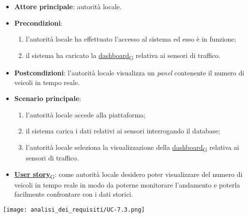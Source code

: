 \begin{itemize}
	\item \textbf{Attore principale}: autorità locale.
	\item \textbf{Precondizioni}:
	      \begin{enumerate}
		      \item l'autorità locale ha effettuato l'accesso al sistema ed esso è in funzione;
		      \item il sistema ha caricato la \href{https://7last.github.io/docs/rtb/documentazione-interna/glossario\#dashboard}{dashboard\textsubscript{G}} relativa ai sensori di traffico.
	      \end{enumerate}
	\item \textbf{Postcondizioni}: l'autorità locale visualizza un \textit{panel} contenente il numero di veicoli in tempo reale.
	\item \textbf{Scenario principale}:
	      \begin{enumerate}
		      \item l'autorità locale accede alla piattaforma;
		      \item il sistema carica i dati relativi ai sensori interrogando il database;
		      \item l'autorità locale seleziona la visualizzazione della \href{https://7last.github.io/docs/rtb/documentazione-interna/glossario\#dashboard}{dashboard\textsubscript{G}} relativa ai sensori di traffico.
	      \end{enumerate}
	\item \href{https://7last.github.io/docs/rtb/documentazione-interna/glossario\#user-story}{\textbf{User story}\textsubscript{G}}:
	      come autorità locale desidero poter visualizzare del numero di veicoli in tempo reale in modo da poterne monitorare l'andamento
	      e poterla facilmente confrontare con i dati storici.
\end{itemize}
\begin{center}
	\texttt{[image: analisi\_dei\_requisiti/UC-7.3.png]}
\end{center}

\newpage

